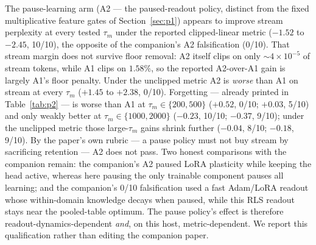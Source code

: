 \documentclass[preprint,12pt]{elsarticle}
\begin{document}
The pause-learning arm (A2 --- the paused-readout policy, distinct from the
fixed multiplicative feature gates of Section~\ref{sec:p1})
appears to improve stream perplexity at every tested
$\tau_m$ under the reported clipped-linear metric ($-1.52$ to $-2.45$,
10/10), the opposite of the companion's A2 falsification (0/10). That
stream margin does not survive floor removal: A2 itself clips on only
$\sim4\times10^{-5}$ of stream tokens, while A1 clips on $1.58\%$, so
the reported A2-over-A1 gain is largely A1's floor penalty. Under the
unclipped metric A2 is \emph{worse} than A1 on stream at every
$\tau_m$ ($+1.45$ to $+2.38$, 0/10). Forgetting --- already printed in
Table~\ref{tab:p2} --- is worse than A1 at $\tau_m\in\{200,500\}$
($+0.52$, 0/10; $+0.03$, 5/10) and only weakly better at
$\tau_m\in\{1000,2000\}$ ($-0.23$, 10/10; $-0.37$, 9/10); under the
unclipped metric those large-$\tau_m$ gains shrink further
($-0.04$, 8/10; $-0.18$, 9/10). By the paper's own rubric ---
a pause policy must not buy stream by sacrificing retention --- A2
does not pass. Two honest comparisons with the companion remain: the
companion's A2 paused LoRA plasticity while keeping the head active,
whereas here pausing the only trainable component pauses all learning;
and the companion's 0/10 falsification used a fast Adam/LoRA readout
whose within-domain knowledge decays when paused, while this RLS
readout stays near the pooled-table optimum. The pause policy's effect
is therefore readout-dynamics-dependent \emph{and}, on this host,
metric-dependent. We report this qualification rather than editing the
companion paper.
\end{document}
